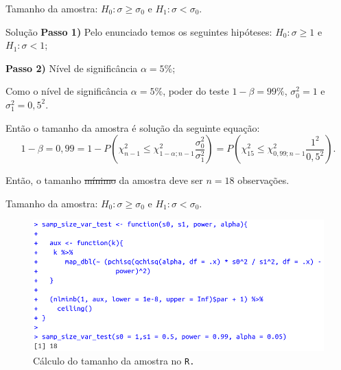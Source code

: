 \documentclass[8pt]{beamer}
\begin{document}
\begin{frame}{Tamanho da amostra: $H_0: \sigma \geq \sigma_0$ e $H_1: \sigma < \sigma_0$.}

\begin{block}{Solução}
	\textbf{Passo 1)} Pelo enunciado temos os seguintes hipóteses: $H_0: \sigma \geq 1 $ e $H_1: \sigma < 1$;
	
	\textbf{Passo 2)} Nível de significância $\alpha=5\%$;
	
	Como o nível de significância $\alpha=5\%$, poder do teste $1-\beta=99\%$, $\sigma_0^2=1$ e $\sigma_1^2=0,5^2$.
	
	Então o tamanho da amostra é solução da seguinte equação:
	$$1-\beta=0,99=1-P\left( \chi_{n-1}^2 \leq \chi_{1-\alpha;n-1}^2 \frac{\sigma_0^2}{\sigma_1^2} \right) = P\left( \chi_{15}^2 \leq \chi_{0,99;n-1}^2 \frac{1^2}{0,5^2} \right).$$
	
	Então, o tamanho \sout{mínimo} da amostra deve ser $n=18$ observações.
\end{block}

\end{frame}

\begin{frame}{Tamanho da amostra: $H_0: \sigma \geq \sigma_0$ e $H_1: \sigma < \sigma_0$.}

\begin{figure}[htbp]
	\centering
	\includegraphics[width=1\linewidth]{figures/var-test-power-unilateral-h0-upper-R.png}
	\caption{Cálculo do tamanho da amostra no \texttt{R.}}
\end{figure}

\end{frame}
\end{document}
